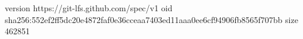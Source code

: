 version https://git-lfs.github.com/spec/v1
oid sha256:552ef2ff5dc20e4872faf0e36cceaa7403ed11aaa0ee6cf94906fb8565f707bb
size 462851
